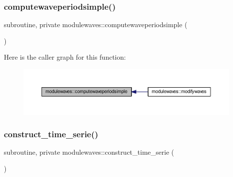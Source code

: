 \subsubsection{\texorpdfstring{computewaveperiodsimple()}{computewaveperiodsimple()}}
{\footnotesize\ttfamily subroutine, private modulewaves\+::computewaveperiodsimple (\begin{DoxyParamCaption}{ }\end{DoxyParamCaption})\hspace{0.3cm}{\ttfamily [private]}}

Here is the caller graph for this function\+:\nopagebreak
\begin{figure}[H]
\begin{center}
\leavevmode
\includegraphics[width=350pt]{namespacemodulewaves_a8fac90eb88cf4a39a40d63dbc040c2fa_icgraph}
\end{center}
\end{figure}
\mbox{\label{namespacemodulewaves_a86eae20876164ce3f5e09fbb27e80f64}} 
\subsubsection{\texorpdfstring{construct\+\_\+time\+\_\+serie()}{construct\_time\_serie()}}
{\footnotesize\ttfamily subroutine, private modulewaves\+::construct\+\_\+time\+\_\+serie (\begin{DoxyParamCaption}{ }\end{DoxyParamCaption})\hspace{0.3cm}{\ttfamily [private]}}

